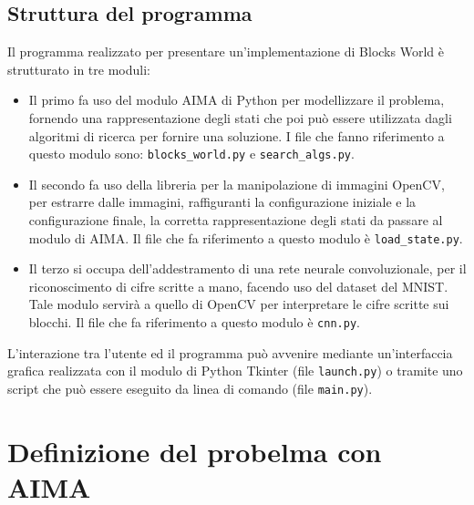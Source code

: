 \documentclass{article}
\begin{document}
	\subsection{Struttura del programma}
	Il programma realizzato per presentare un'implementazione di Blocks World è strutturato in tre moduli:
	\begin{itemize}
		\item Il primo fa uso del modulo AIMA di Python per modellizzare il problema, fornendo una rappresentazione degli stati che poi può essere utilizzata dagli algoritmi di ricerca per fornire una soluzione. I file che fanno riferimento a questo modulo sono: \verb*|blocks_world.py| e \verb*|search_algs.py|.
		\item Il secondo fa uso della libreria per la manipolazione di immagini OpenCV, per estrarre dalle immagini, raffiguranti la configurazione iniziale e la configurazione finale, la corretta rappresentazione degli stati da passare al modulo di AIMA. Il file che fa riferimento a questo modulo è \verb*|load_state.py|.
		\item Il terzo si occupa dell'addestramento di una rete neurale convoluzionale, per il riconoscimento di cifre scritte a mano, facendo uso del dataset del MNIST. Tale modulo servirà a quello di OpenCV per interpretare le cifre scritte sui blocchi. Il file che fa riferimento a questo modulo è \verb*|cnn.py|.
	\end{itemize}
	L'interazione tra l'utente ed il programma può avvenire mediante un'interfaccia grafica realizzata con il modulo di Python Tkinter (file \verb*|launch.py|) o tramite uno script che può essere eseguito da linea di comando (file \verb*|main.py|).

	\section{Definizione del probelma con AIMA}
\end{document}
